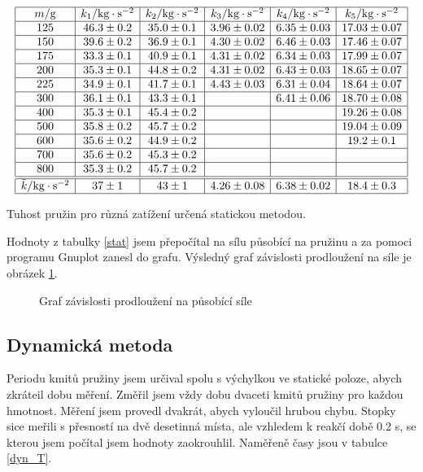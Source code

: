 \documentclass[a4paper,12pt]{article}
\begin{document}
\begin{table}
$$
\begin{array}{|c|c|c|c|c|c|}
\hline
m/\mbox{g}&	k_1/\mbox{kg}\cdot\mbox{s}^{-2}&	k_2/\mbox{kg}\cdot\mbox{s}^{-2}&	
k_3/\mbox{kg}\cdot\mbox{s}^{-2}&	k_4/\mbox{kg}\cdot\mbox{s}^{-2}&	k_5/\mbox{kg}\cdot\mbox{s}^{-2}	\\ \hline	
125&	46.3\pm 0.2&	35.0\pm 0.1&	3.96\pm 0.02&	6.35\pm 0.03&	17.03\pm 0.07	\\ \hline
150&	39.6\pm 0.2&	36.9\pm 0.1&	4.30\pm 0.02&	6.46\pm 0.03&	17.46\pm 0.07	\\ \hline
175&	33.3\pm 0.1&	40.9\pm 0.1&	4.31\pm 0.02&	6.34\pm 0.03&	17.99\pm 0.07	\\ \hline
200&	35.3\pm 0.1&	44.8\pm 0.2&	4.31\pm 0.02&	6.43\pm 0.03&	18.65\pm 0.07	\\ \hline
225&	34.9\pm 0.1&	41.7\pm 0.1&	4.43\pm 0.03&	6.31\pm 0.04&	18.64\pm 0.07	\\ \hline
300&	36.1\pm 0.1&	43.3\pm 0.1&	&		6.41\pm 0.06&	18.70\pm 0.08	\\ \hline
400&	35.3\pm 0.1&	45.4\pm 0.2&	&		&		19.26\pm 0.08	\\ \hline
500&	35.8\pm 0.2&	45.7\pm 0.2&	&		&		19.04\pm 0.09	\\ \hline
600&	35.6\pm 0.2&	44.9\pm 0.2&	&		&		19.2\pm 0.1	\\ \hline
700&	35.6\pm 0.2&	45.3\pm 0.2&	&		&				\\ \hline
800&	35.3\pm 0.2&	45.7\pm 0.2&	&		&				\\ \hline \hline
\bar k/\mbox{kg}\cdot\mbox{s}^{-2}&		37\pm1&		43\pm1&		4.26\pm0.08&	6.38\pm 0.02&	18.4\pm0.3	\\ \hline
\end{array}
$$
\caption{Tuhost pružin pro různá zatížení určená statickou metodou.}
\label{t_stat}
\end{table}

Hodnoty z tabulky \ref{stat} jsem přepočítal na sílu působící na pružinu a za pomoci programu Gnuplot zanesl do grafu. 
Výsledný graf závislosti prodloužení na síle je obrázek \ref{g_stat}.
\begin{figure}
\begin{center}
	
\end{center}
	\caption{Graf závislosti prodloužení na působící síle}
	\label{g_stat}
\end{figure}

\subsection{Dynamická metoda}
\noindent
Periodu kmitů pružiny jsem určival spolu s výchylkou ve statické poloze, abych zkráteil dobu měření. 
Změřil jsem vždy dobu dvaceti kmitů pružiny pro každou hmotnost. Měření jsem provedl dvakrát, abych vyloučil hrubou 
chybu. Stopky sice meřili s přesností na dvě desetinná místa, ale vzhledem k reakčí době 0.2 s, se kterou jsem počítal 
jsem hodnoty zaokrouhlil. Naměřeně časy jsou v tabulce \ref{dyn_T}.
\end{document}
